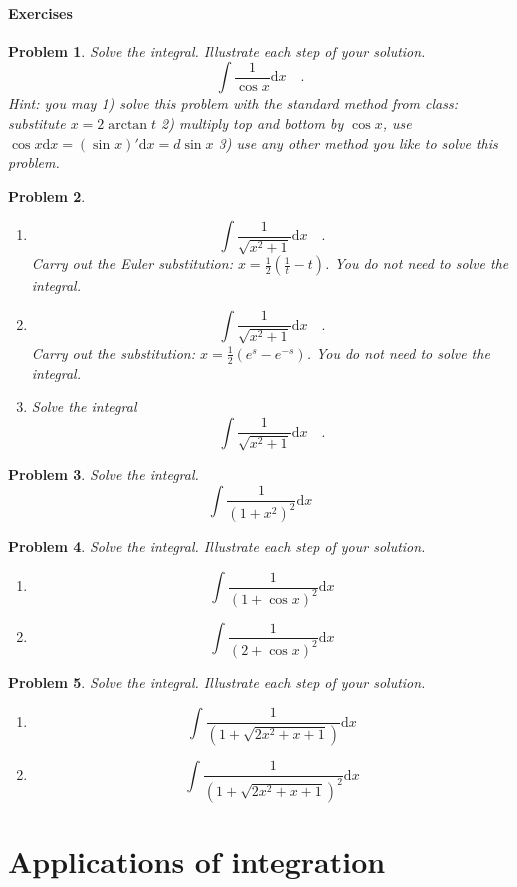 \documentclass[12pt]{book}
\newcommand{\diff}{\text{d}}
\newtheorem{problem}{Problem}[section]
\begin{document}
\subsubsection{Exercises}
\begin{problem}
Solve the integral. Illustrate each step of your solution.
\[
\int \frac{1}{\cos x}\diff x\quad .
\]
Hint: you may  1) solve this problem with the standard method from class: substitute $x=2 \arctan t$ 2)  multiply top and bottom by $\cos x$, use $\cos x \diff x = (\sin x)' \diff x = d\sin x$ 3) use any other method you like to solve this problem.
\end{problem}
\begin{problem}~
\begin{enumerate}
\item
\[
\int \frac{1}{\sqrt{x^2+1}}\diff x\quad .
\]
Carry out the Euler substitution: $x=\frac12\left(\frac{1}{t}- t\right)$. You do not need to solve the integral.
\item
\[
\int \frac{1}{\sqrt{x^2+1}}\diff x\quad .
\]
Carry out the substitution: $x=\frac12\left(e^s- e^{-s}\right)$. You do not need to solve the integral.
\item Solve the integral 
\[
\int \frac{1}{\sqrt{x^2+1}}\diff x\quad .
\]
\end{enumerate}
\end{problem}

\begin{problem}
Solve the integral. 
\[
\int \frac{1}{(1+x^2)^2}\diff x
\]
\end{problem}

\begin{problem}
Solve the integral. Illustrate each step of your solution.
\begin{enumerate}
\item
\[
\int \frac{1}{(1 + \cos x)^2}\diff x
\]
\item
\[
\int \frac{1}{(2+\cos x)^2}\diff x
\]
\end{enumerate}
\end{problem}
\begin{problem}
Solve the integral. Illustrate each step of your solution.
\begin{enumerate}
\item
\[
\int \frac{1}{(1 + \sqrt{2x^2+x+1})}\diff x
\]
\item
\[
\int \frac{1}{(1 + \sqrt{2x^2+x+1})^2}\diff x
\]
\end{enumerate}
\end{problem}
\chapter{Applications of integration}
\end{document}
